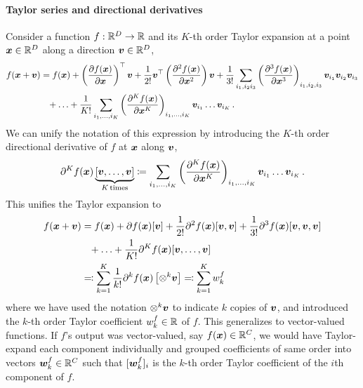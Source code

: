 \paragraph{Taylor series and directional derivatives} Consider a function $f: {\mathbb{R}}^D \to {\mathbb{R}}$ and its $K$-th order Taylor expansion at a point ${\bm{x}} \in {\mathbb{R}}^D$ along a direction ${\bm{v}} \in {\mathbb{R}}^D$,
\begin{align}
  \begin{split}
    f({\bm{x}} + {\bm{v}})
    &=
      f({\bm{x}})
      +
      \left(
      \frac{\partial f({\bm{x}})}{\partial {\bm{x}}}
      \right)^{\top} {\bm{v}}
      +
      \frac{1}{2!}
      {\bm{v}}^\top
      \left(
      \frac{\partial^2 f({\bm{x}})}{\partial {\bm{x}}^2}
      \right) {\bm{v}}
      +
      \frac{1}{3!}
      \sum_{i_1, i_2 i_3}
      \left(
      \frac{\partial^3 f({\bm{x}})}{\partial{\bm{x}}^3}
      \right)_{i_1, i_2, i_3} {\bm{v}}_{i_1} {\bm{v}}_{i_2} {\bm{v}}_{i_3}
    \\
    &\phantom{=}+
      \ldots
      +
      \frac{1}{K!}
      \sum_{i_1, \dots, i_K}
      \left(
      \frac{\partial^K f({\bm{x}})}{\partial{\bm{x}}^K}
      \right)_{i_1, \dots, i_K} {\bm{v}}_{i_1} \dots {\bm{v}}_{i_K}\,.
  \end{split}
\end{align}
We can unify the notation of this expression by introducing the $K$-th order directional derivative of $f$ at ${\bm{x}}$ along ${\bm{v}}$,
\begin{align}
  \partial^K f({\bm{x}})
  \underbrace{\left[ {\bm{v}}, \ldots, {\bm{v}} \right]}_{K\,\text{times}}
  \coloneqq
  \sum_{i_1, \dots, i_K}
  \left(
  \frac{\partial^K f({\bm{x}})}{\partial{\bm{x}}^K}
  \right)_{i_1, \dots, i_K} {\bm{v}}_{i_1} \dots {\bm{v}}_{i_K}\,.
\end{align}
This unifies the Taylor expansion to
\begin{align}
  \begin{split}
    f({\bm{x}} + {\bm{v}})
    &=
      f({\bm{x}})
      +
      \partial f({\bm{x}})[{\bm{v}}]
      +
      \frac{1}{2!}
      \partial^2 f({\bm{x}})[{\bm{v}}, {\bm{v}}]
      +
      \frac{1}{3!}
      \partial^3 f({\bm{x}})[{\bm{v}}, {\bm{v}}, {\bm{v}}]
    \\
    &\phantom{=}+
      \ldots
      +
      \frac{1}{K!}
      \partial^K f({\bm{x}})[{\bm{v}}, \ldots, {\bm{v}}]
    \\
    &\eqqcolon
      \sum_{k=1}^K
      \frac{1}{k!}
      \partial^k f({\bm{x}})\left[\otimes^k {\bm{v}}  \right]
      \eqqcolon
      \sum_{k=1}^K
      w^f_k
  \end{split}
\end{align}
where we have used the notation $\otimes^k {\bm{v}}$ to indicate $k$ copies of ${\bm{v}}$, and introduced the $k$-th order Taylor coefficient $w^f_k \in {\mathbb{R}}$ of $f$.
This generalizes to vector-valued functions.
If $f$'s output was vector-valued, say $f({\bm{x}}) \in {\mathbb{R}}^C$, we would have Taylor-expand each component individually and grouped coefficients of same order into vectors ${\bm{w}}_k^f \in {\mathbb{R}}^C$ such that $[{\bm{w}}_k^f]_i$ is the $k$-th order Taylor coefficient of the $i$th component of $f$.

